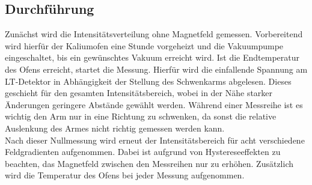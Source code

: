 \subsection{Durchführung}
\label{sec:durchführung}
Zunächst wird die Intensitätsverteilung ohne Magnetfeld gemessen.
Vorbereitend wird hierfür der Kaliumofen eine Stunde vorgeheizt und die Vakuumpumpe eingeschaltet, bis ein gewünschtes Vakuum erreicht wird.
Ist die Endtemperatur des Ofens erreicht, startet die Messung.
Hierfür wird die einfallende Spannung am LT-Detektor in Abhängigkeit der Stellung des Schwenkarms abgelesen.
Dieses geschieht für den gesamten Intensitätsbereich, wobei in der Nähe starker Änderungen geringere Abstände gewählt werden.
Während einer Messreihe ist es wichtig den Arm nur in eine Richtung zu schwenken, da sonst die relative Auslenkung des Armes nicht richtig gemessen werden kann.\\
Nach dieser Nullmessung wird erneut der Intensitätsbereich für acht verschiedene Feldgradienten aufgenommen.
Dabei ist aufgrund von Hystereseeffekten zu beachten, das Magnetfeld zwischen den Messreihen nur zu erhöhen.
Zusätzlich wird die Temperatur des Ofens bei jeder Messung aufgenommen.
